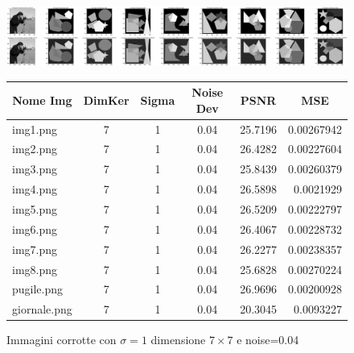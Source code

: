 \begin{figure}[H]
    \centering
    \begin{minipage}[h]{\textwidth}
    \includegraphics[width=\linewidth]{output/tabCorrotte/imgcorr7.png}\label{fig:imgcorrotte7}
    \end{minipage}
    \begin{minipage}[h]{\textwidth}
        \centering
        
        \begin{tabular}{|l c c c c r|}
            \hline
            \multicolumn{1}{|c}{\textbf{Nome Img}} & \multicolumn{1}{|c}{\textbf{DimKer}} & \multicolumn{1}{|c}{\textbf{Sigma}} & \multicolumn{1}{|c}{\textbf{Noise Dev}} & \multicolumn{1}{|c}{\textbf{PSNR}} & \multicolumn{1}{|c|}{\textbf{MSE}} \\ \hline
                img1.png & 7 & 1 & 0.04 & 25.7196 & 0.00267942 \\
                img2.png & 7 & 1 & 0.04 & 26.4282 & 0.00227604 \\
                img3.png & 7 & 1 & 0.04 & 25.8439 & 0.00260379 \\
                img4.png & 7 & 1 & 0.04 & 26.5898 & 0.0021929 \\                
                img5.png & 7 & 1 & 0.04 & 26.5209 & 0.00222797 \\ 
                img6.png & 7 & 1 & 0.04 & 26.4067 & 0.00228732 \\
                img7.png & 7 & 1 & 0.04 & 26.2277 & 0.00238357 \\
                img8.png & 7 & 1 & 0.04 & 25.6828 & 0.00270224 \\
                pugile.png & 7 & 1 & 0.04 & 26.9696 & 0.00200928 \\
                giornale.png & 7 & 1 & 0.04 & 20.3045 & 0.0093227\\ \hline
            \end{tabular}\label{tab:tabcorrotte7}
        
        \end{minipage}
    \captionsetup{labelformat=andtable}
    \caption{Immagini corrotte con $\sigma = 1$ dimensione $7 \times 7$ e noise=0.04}
\end{figure}

